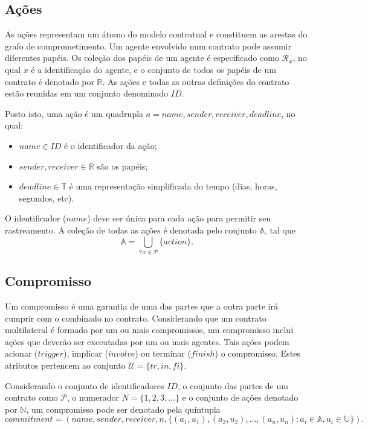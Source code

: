 \subsection*{Ações}

As ações representam um átomo do modelo contratual e constituem as arestas do grafo de comprometimento. Um agente envolvido num contrato pode assumir diferentes papéis. Os coleção dos papéis de um agente é especificado como $\mathcal{R}_{x}$, no qual $x$ é a identificação do agente, e o conjunto de todos os papéis de um contrato é denotado por $\mathbb{R}$. As ações e todas as outras definições do contrato estão reunidas em um conjunto denominado $ID$.

Posto isto, uma ação é um quadrupla $a = name, sender, receiver, deadline$, no qual:
\begin{itemize}
	\item $name \in ID$ é o identificador da ação;
	\item $sender, receiver \in \mathbb{R}$ são os papéis;
	\item $deadline \in \mathbb{T}$ é uma representação simplificada do tempo (dias, horas, segundos, etc).
\end{itemize}

O identificador ($name$) deve ser única para cada ação para permitir seu rastreamento. A coleção de todas as ações é denotada pelo conjunto $\mathbb{A}$, tal que $$\mathbb{A} = \underset{\forall x \in \mathcal{P}}{\bigcup}\{action\}.$$

\subsection*{Compromisso}

Um compromisso é uma garantia de uma das partes que a outra parte irá cumprir com o combinado no contrato. Considerando que um contrato multilateral é formado por um ou mais compromissos, um compromisso inclui ações que deverão ser executadas por um ou mais agentes. Tais ações podem acionar ($trigger$), implicar ($involve$) ou terminar ($finish$) o compromisso. Estes atributos pertencem ao conjunto $\mathcal{U} = \{tr,in,fi\}$.

Considerando o conjunto de identificadores $ID$, o conjunto das partes de um contrato como $\mathcal{P}$, o numerador $N = \{1, 2, 3, ...\}$ e o conjunto de ações denotado por $\mathbb{N}$, um compromisso pode ser denotado pela quíntupla $$commitment = (name, sender, receiver, n, \{(a_{1},u_{1}), (a_{2}, u_{2}), ..., (a_{n}, u_{n}) \colon a_{i} \in \mathbb{A}, u_{i} \in \mathbb{U}\}).$$

